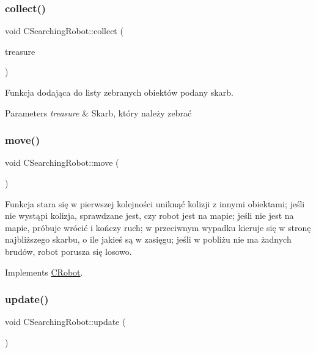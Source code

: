 \subsubsection{\texorpdfstring{collect()}{collect()}}
{\footnotesize\ttfamily void C\+Searching\+Robot\+::collect (\begin{DoxyParamCaption}\item[{\mbox{\hyperlink{class_c_treasure}{C\+Treasure}} $\ast$}]{treasure }\end{DoxyParamCaption})}



Funkcja dodająca do listy zebranych obiektów podany skarb. 


\begin{DoxyParams}{Parameters}
{\em treasure} & Skarb, który należy zebrać \\
\hline
\end{DoxyParams}
\mbox{\label{class_c_searching_robot_a2c2150e7fd1cefbb5851e039cd76572f}} 
\subsubsection{\texorpdfstring{move()}{move()}}
{\footnotesize\ttfamily void C\+Searching\+Robot\+::move (\begin{DoxyParamCaption}{ }\end{DoxyParamCaption})\hspace{0.3cm}{\ttfamily [virtual]}}



Funkcja stara się w pierwszej kolejności uniknąć kolizji z innymi obiektami; jeśli nie wystąpi kolizja, sprawdzane jest, czy robot jest na mapie; jeśli nie jest na mapie, próbuje wrócić i kończy ruch; w przeciwnym wypadku kieruje się w stronę najbliższego skarbu, o ile jakieś są w zasięgu; jeśli w pobliżu nie ma żadnych brudów, robot porusza się losowo. 



Implements \mbox{\hyperlink{class_c_robot_a1de9be879213eadf7ded27caedb84598}{C\+Robot}}.

\mbox{\label{class_c_searching_robot_a6e9cdc9eccd32a470d8953f1a3cccd46}} 
\subsubsection{\texorpdfstring{update()}{update()}}
{\footnotesize\ttfamily void C\+Searching\+Robot\+::update (\begin{DoxyParamCaption}{ }\end{DoxyParamCaption})\hspace{0.3cm}{\ttfamily [virtual]}}



